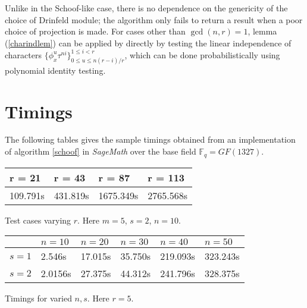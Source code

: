 \documentclass[sigconf]{acmart}
\newcommand{\F}{\mathbb{F}}
\begin{document}
Unlike in the Schoof-like case, there is no dependence on the genericity of the choice of Drinfeld module; the algorithm only fails to return a result when a poor choice of projection is made. For cases other than $\gcd(n,r) = 1$, lemma (\ref{charindlem}) can be applied by directly by testing the linear independence of characters $\{ \phi_x^{u}\tau^{ni} \}_{0 \leq u \leq n(r-i)/r }^{1 \leq i < r}$, which can be done probabilistically using polynomial identity testing. 

\section{Timings}

The following tables gives the sample timings obtained from an implementation of algorithm \ref{schoof} in \textit{SageMath} over the base field $\F_q = GF(1327)$.

\begin{center}
\begin{tabular}{ | m{1.5cm}| m{1.4cm} | m{1.4cm} | m{1.5cm} | } 
\hline
 r = 21 & r = 43 & r = 87 &  r = 113  \\ 
\hline
 109.791s &	431.819s & 1675.349s	 & 2765.568s\\
\hline 
\end{tabular}
\end{center}
\begin{table}[h!]
  \centering
  \caption{Test cases varying $r$. Here $m = 5$, $s = 2$, $n = 10$. }
  \label{tab:table-sample}
\end{table}

\begin{center}
\begin{tabular}{ | m{1cm} | m{1cm}| m{1cm} | m{1cm} | m{1cm} | m{1cm} | } 
\hline
 & $n = 10$ & $n = 20$ & $n = 30$ & $n = 40$ & $n = 50$  \\ 
\hline
$s = 1$ & 2.546s & 17.015s & 35.750s & 219.093s & 323.243s \\
\hline 
$s = 2$  & 2.0156s & 27.375s & 44.312s & 241.796s & 328.375s \\ 
\hline
\end{tabular}
\end{center}
\begin{table}[h!]
  \centering
  \caption{Timings for varied $n,s$. Here $r = 5$. }
  \label{tab:table-sample}
\end{table}














\end{document}
